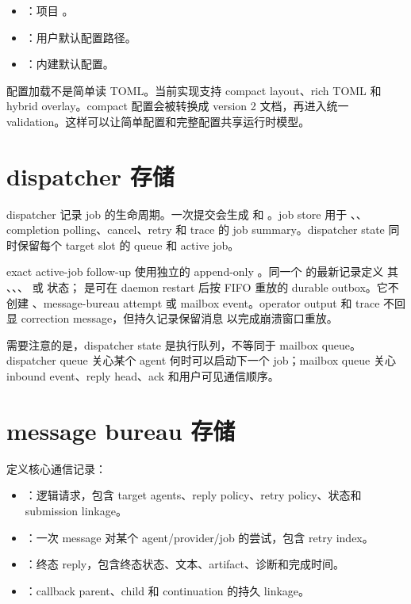 \begin{itemize}
  \item {}：项目 。
  \item {}：用户默认配置路径。
  \item {}：内建默认配置。
\end{itemize}

配置加载不是简单读 TOML。当前实现支持 compact layout、rich TOML 和 hybrid overlay。compact 配置会被转换成 version 2 文档，再进入统一 validation。这样可以让简单配置和完整配置共享运行时模型。

\section{dispatcher 存储}

dispatcher 记录 job 的生命周期。一次提交会生成  和 。job store 用于 、、completion polling、cancel、retry 和 trace 的 job summary。dispatcher state 同时保留每个 target slot 的 queue 和 active job。

exact active-job follow-up 使用独立的 append-only
。同一个  的最新记录定义
其 、、、 或
 状态； 是可在 daemon restart 后按 FIFO 重放的
durable outbox。它不创建 、message-bureau attempt 或 mailbox
event。operator output 和 trace 不回显 correction message，但持久记录保留消息
以完成崩溃窗口重放。

需要注意的是，dispatcher state 是执行队列，不等同于 mailbox queue。dispatcher queue 关心某个 agent 何时可以启动下一个 job；mailbox queue 关心 inbound event、reply head、ack 和用户可见通信顺序。

\section{message bureau 存储}

 定义核心通信记录：

\begin{itemize}
  \item {}：逻辑请求，包含 target agents、reply policy、retry policy、状态和 submission linkage。
  \item {}：一次 message 对某个 agent/provider/job 的尝试，包含 retry index。
  \item {}：终态 reply，包含终态状态、文本、artifact、诊断和完成时间。
  \item {}：callback parent、child 和 continuation 的持久 linkage。
\end{itemize}

